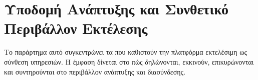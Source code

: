 \chapter{Υποδομή Ανάπτυξης και Συνθετικό Περιβάλλον Εκτέλεσης}
\label{app:infrastructure_environment}

Το παράρτημα αυτό συγκεντρώνει τα  που καθιστούν την πλατφόρμα εκτελέσιμη ως σύνθεση υπηρεσιών.
Η έμφαση δίνεται στο πώς δηλώνονται, εκκινούν, επικυρώνονται και συντηρούνται στο περιβάλλον ανάπτυξης και διασύνδεσης.



